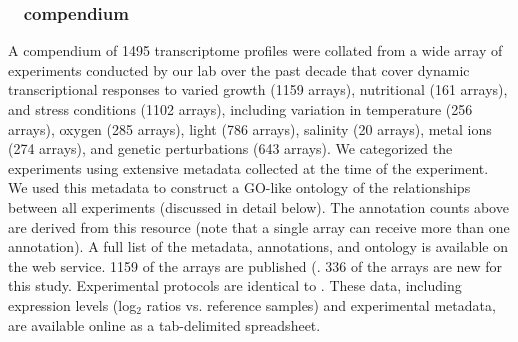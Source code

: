 
\subsubsection{\halo~ compendium}\label{halodata}

A compendium of 1495 transcriptome profiles were collated from a wide
array of experiments conducted by our lab over the past decade that
cover dynamic transcriptional responses to varied growth (1159
arrays), nutritional (161 arrays), and stress conditions (1102
arrays), including variation in temperature (256 arrays), oxygen (285
arrays), light (786 arrays), salinity (20 arrays), metal ions (274
arrays), and genetic perturbations (643 arrays).  We categorized the
experiments using extensive metadata collected at the time of the
experiment. We used this metadata to construct a GO-like ontology of
the relationships between all experiments (discussed in detail below).
The annotation counts above are derived from this resource (note that
a single array can receive more than one annotation).  A full list of
the metadata, annotations, and ontology is available on the web
service.  1159 of the arrays are published
(\cite{Baliga2004a,Baliga2002,Bonneau2007,Facciotti2010,Facciotti2007a,Kaur2006,Kaur2010,Schmid2011,Schmid2007,Schmid2009,Whitehead2006,Whitehead2009}. 336
of the arrays are new for this study. Experimental protocols are
identical to \cite{Bonneau2007}. These data, including expression
levels (log$_2$ ratios vs. reference samples) and experimental
metadata, are available online as a tab-delimited spreadsheet.


